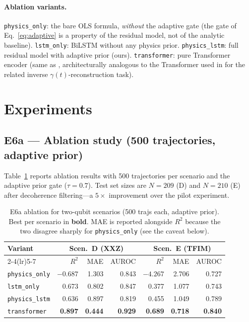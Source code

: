 \documentclass[twocolumn,10pt]{article}
\begin{document}
\paragraph{Ablation variants.}
\texttt{physics\_only}: the bare OLS formula, \emph{without} the adaptive gate
(the gate of Eq.~\ref{eq:adaptive} is a property of the residual model, not of
the analytic baseline).
\texttt{lstm\_only}: BiLSTM without any physics prior.
\texttt{physics\_lstm}: full residual model with adaptive prior (ours).
\texttt{transformer}: pure Transformer encoder \cite{Vaswani2017} (same
as \cite{Paper1Brusnikin}, architecturally analogous to the Transformer
used in \cite{TransformerLindblad2025} for the related inverse
$\gamma(t)$-reconstruction task).

\section{Experiments}

\subsection{E6a --- Ablation study (500 trajectories, adaptive prior)}
\label{sec:e1}

Table~\ref{tab:e1_2} reports ablation results with 500 trajectories per
scenario and the adaptive prior gate ($\tau = 0.7$).
Test set sizes are $N = 209$ (D) and $N = 210$ (E) after decoherence
filtering---a $5\times$ improvement over the pilot experiment.

\begin{table}[h]
\centering
\caption{E6a ablation for two-qubit scenarios (500 trajs each, adaptive
  prior). Best per scenario in \textbf{bold}. MAE is reported alongside
  $R^2$ because the two disagree sharply for \texttt{physics\_only}
  (see the caveat below).\label{tab:e1_2}}
\footnotesize
\setlength{\tabcolsep}{2.5pt}
\begin{tabular}{lrrrrrr}
\toprule
Variant & \multicolumn{3}{c}{Scen.~D (XXZ)} & \multicolumn{3}{c}{Scen.~E (TFIM)} \\
\cmidrule(lr){2-4}\cmidrule(lr){5-7}
        & $R^2$ & MAE & AUROC & $R^2$ & MAE & AUROC \\
\midrule
\texttt{physics\_only}
  & $-0.687$ & 1.303 & 0.843
  & $-4.267$ & 2.706 & 0.727 \\
\texttt{lstm\_only}
  & 0.673 & 0.802 & 0.847
  & 0.377 & 1.077 & 0.743 \\
\texttt{physics\_lstm}
  & 0.636 & 0.897 & 0.819
  & 0.455 & 1.049 & 0.789 \\
\texttt{transformer}
  & \textbf{0.897} & \textbf{0.444} & \textbf{0.929}
  & \textbf{0.689} & \textbf{0.718} & \textbf{0.840} \\
\bottomrule
\end{tabular}
\end{table}
\end{document}
